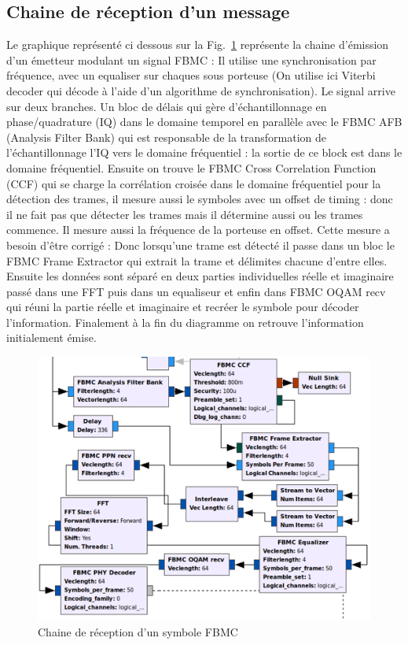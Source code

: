 \documentclass[conference]{IEEEtran}
\begin{document}
\subsection{Chaine de réception d'un message}
Le graphique représenté ci dessous sur la Fig.~\ref{RecepteurFBMC} représente la chaine d'émission d'un émetteur modulant un signal FBMC : Il utilise une synchronisation par fréquence, avec un equaliser sur chaques sous porteuse (On utilise ici Viterbi decoder qui décode à l'aide d'un algorithme de synchronisation)\cite{b2}. Le signal arrive sur deux branches. Un bloc de délais qui gère d’échantillonnage en phase/quadrature (IQ) dans le domaine temporel en parallèle avec le FBMC AFB (Analysis Filter Bank) qui est responsable de la transformation de l'échantillonnage l’IQ vers le domaine fréquentiel : la sortie de ce block est dans le domaine fréquentiel. Ensuite on trouve le FBMC Cross Correlation Function (CCF) qui se charge la corrélation croisée dans le domaine fréquentiel pour la détection des trames, il mesure aussi le symboles avec un offset de timing : donc il ne fait pas que détecter les trames mais il détermine aussi ou les trames commence. Il mesure aussi la fréquence de la porteuse en offset. Cette mesure a besoin d’être corrigé : Donc lorsqu’une trame est détecté il passe dans un bloc le FBMC Frame Extractor qui extrait la trame et délimites chacune d’entre elles. Ensuite les données sont séparé en deux parties individuelles réelle et imaginaire passé dans une FFT puis dans un equaliseur et enfin dans FBMC OQAM recv qui réuni la partie réelle et imaginaire et recréer le symbole pour décoder l’information. Finalement à la fin du diagramme on retrouve l’information initialement émise.


\begin{figure}[htbp]
\centerline{\includegraphics{RecepteurFBMC.png}}
\caption{Chaine de réception d'un symbole FBMC}
\label{RecepteurFBMC}
\end{figure}
\end{document}
